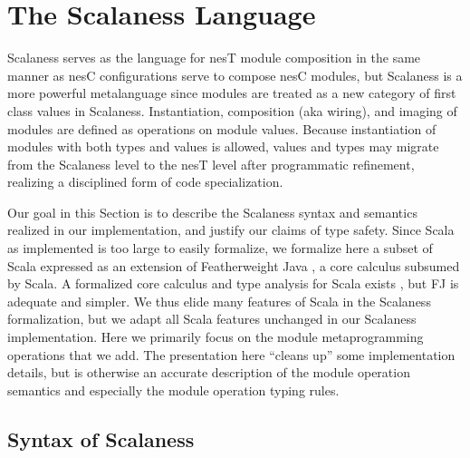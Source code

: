 \section{The Scalaness Language}
\label{section-scalaness}

Scalaness serves as the language for nesT module composition in the same manner as nesC
configurations serve to compose nesC modules, but Scalaness is a more powerful metalanguage
since modules are treated as a new category of first class values in Scalaness. Instantiation,
composition (aka wiring), and imaging of modules are defined as operations on module values.
Because instantiation of modules with both types and values is allowed, values and types may
migrate from the Scalaness level to the nesT level after programmatic refinement, realizing a
disciplined form of code specialization.

Our goal in this Section is to describe the Scalaness syntax and semantics realized in our
implementation, and justify our claims of type safety. Since Scala as implemented is too large
to easily formalize, we formalize here a subset of Scala expressed as an extension of
Featherweight Java \cite{FJ}, a core calculus subsumed by Scala. A formalized core calculus and
type analysis for Scala exists \cite{Cremet:2006:CCS:2135978.2135980}, but FJ is adequate and
simpler. We thus elide many features of Scala in the Scalaness formalization, but we adapt all
Scala features unchanged in our Scalaness implementation. Here we primarily focus on the module
metaprogramming operations that we add. The presentation here ``cleans up'' some implementation
details, but is otherwise an accurate description of the module operation semantics and
especially the module operation typing rules.


\subsection{Syntax of Scalaness}

